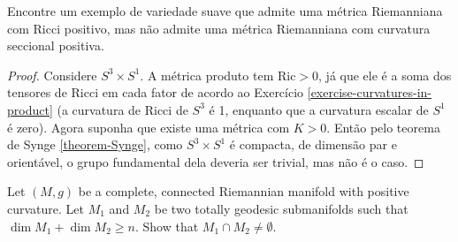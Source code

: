 \begin{exercise}
\label{exercise-posit-ricci-but-no-posit-duplicate-2}
Encontre um exemplo de variedade suave que
admite uma métrica Riemanniana com
Ricci positivo, mas não admite uma métrica
Riemanniana com curvatura seccional
positiva.
\end{exercise}

\begin{proof}
Considere $S^3\times S^1$. A métrica produto
tem $\text{Ric}>0$, já que ele é a
soma dos tensores de Ricci em cada fator de
acordo ao Exercício
\ref{exercise-curvatures-in-product} (a
curvatura de Ricci de $S^3$ é 1,
enquanto que a curvatura escalar de $S^1$ é
zero). Agora suponha que existe uma
 métrica com $K>0$. Então pelo teorema de
 Synge \ref{theorem-Synge}, como
$S^3\times S^1$ é compacta, de dimensão par e
orientável, o grupo fundamental
dela deveria ser trivial, mas não é o caso.
\end{proof}

\begin{exercise}
\label{exercise-two-total-geode-subma}
Let $(M,g)$ be a complete, connected
Riemannian manifold with positive
curvature. Let $M_1$ and $M_2$ be two totally
geodesic submanifolds such that
$\dim M_1+\dim M_2\geq n$. Show that $M_1\cap
M_2\neq \emptyset$.
\end{exercise}


